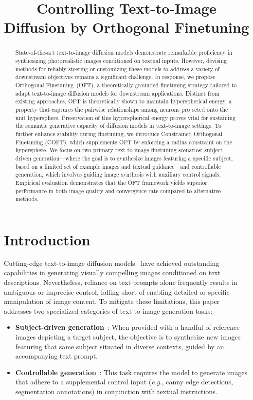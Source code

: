 \title{Controlling Text-to-Image Diffusion by Orthogonal Finetuning}

\begin{abstract}
State-of-the-art text-to-image diffusion models demonstrate remarkable proficiency in synthesizing photorealistic images conditioned on textual inputs. However, devising methods for reliably steering or customizing these models to address a variety of downstream objectives remains a significant challenge. In response, we propose Orthogonal Finetuning~(OFT), a theoretically grounded finetuning strategy tailored to adapt text-to-image diffusion models for downstream applications. Distinct from existing approaches, OFT is theoretically shown to maintain hyperspherical energy, a property that captures the pairwise relationships among neurons projected onto the unit hypersphere. Preservation of this hyperspherical energy proves vital for sustaining the semantic generative capacity of diffusion models in text-to-image settings. To further enhance stability during finetuning, we introduce Constrained Orthogonal Finetuning (COFT), which supplements OFT by enforcing a radius constraint on the hypersphere. We focus on two primary text-to-image finetuning scenarios: subject-driven generation—where the goal is to synthesize images featuring a specific subject, based on a limited set of example images and textual guidance—and controllable generation, which involves guiding image synthesis with auxiliary control signals. Empirical evaluation demonstrates that the OFT framework yields superior performance in both image quality and convergence rate compared to alternative methods.
\end{abstract}

\section{Introduction}

Cutting-edge text-to-image diffusion models~\cite{saharia2022photorealistic,ramesh2022hierarchical,rombach2022high} have achieved outstanding capabilities in generating visually compelling images conditioned on text descriptions. Nevertheless, reliance on text prompts alone frequently results in ambiguous or imprecise control, falling short of enabling detailed or specific manipulation of image content. To mitigate these limitations, this paper addresses two specialized categories of text-to-image generation tasks:

\begin{itemize}[leftmargin=*,nosep]

    \item \textbf{Subject-driven generation}~\cite{ruiz2023dreambooth}: When provided with a handful of reference images depicting a target subject, the objective is to synthesize new images featuring that same subject situated in diverse contexts, guided by an accompanying text prompt.
    \item \textbf{Controllable generation}~\cite{zhang2023adding,mou2023t2i}: This task requires the model to generate images that adhere to a supplemental control input (\emph{e.g.}, canny edge detections, segmentation annotations) in conjunction with textual instructions.
\end{itemize}

